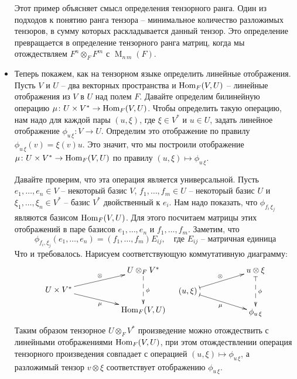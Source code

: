 \begin{itemize}
Этот пример объясняет смысл определения тензорного ранга. Один из подходов к понятию ранга тензора -- минимальное количество разложимых тензоров, в сумму которых раскладывается данный тензор. Это определение превращается в определение тензорного ранга матриц, когда мы отождествляем $F^n\otimes_F F^m$ с $\operatorname{M}_{n\,m}(F)$.

\item Теперь покажем, как на тензорном языке определить линейные отображения. Пусть $V$ и $U$ -- два векторных пространства и $\operatorname{Hom}_F(V, U)$ -- линейные отображения из $V$ в $U$ над полем $F$. Давайте определим билинейную операцию $\mu \colon U\times V^* \to \operatorname{Hom}_F(V, U)$. Чтобы определить такую операцию, нам надо для каждой пары $(u,\xi)$, где $\xi \in V^*$ и $u\in U$, задать линейное отображение $\phi_{u\,\xi}\colon V\to U$. Определим это отображение по правилу $\phi_{u\,\xi}(v) = \xi(v)u$. Это значит, что мы построили отображение $\mu\colon U\times V^* \to \operatorname{Hom}_F(V, U)$ по правилу $(u,\xi)\mapsto \phi_{u\,\xi}$. 

Давайте проверим, что эта операция является универсальной. Пусть $e_1,\ldots,e_n\in V$ -- некоторый базис $V$, $f_1,\ldots,f_m\in U$ -- некоторый базис $U$ и $\xi_1,\ldots,\xi_n\in V^*$ -- базис $V^*$ двойственный к $e_i$. Нам надо показать, что $\phi_{f_i\,\xi_j}$ являются базисом $\operatorname{Hom}_F(V, U)$. Для этого посчитаем матрицы этих отображений в паре базисов $e_1,\ldots,e_n$ и $f_1,\ldots,f_m$. Заметим, что
\[
\phi_{f_i, \xi_j}(e_1,\ldots,e_n) = (f_1,\ldots,f_m)E_{ij},\quad\text{где $E_{ij}$ -- матричная единица}
\]
Что и требовалось. Нарисуем соответствующую коммутативную диаграмму:
\[
\xymatrix@R=10pt{
	{}&{}&{U\otimes_F V^*}\ar@{-->}[dd]^{\phi}\\
	{U\times V^*}\ar[urr]^{\otimes}\ar[drr]_{\mu}&{}&{}\\
	{}&{}&{\Hom_F(V, U)}\\
}
\quad
\xymatrix@R=10pt{
	{}&{}&{u\otimes \xi}\ar@{|-->}[dd]^{\phi}\\
	{(u, \xi)}\ar@{|->}[urr]^{\otimes}\ar@{|->}[drr]_{\mu}&{}&{}\\
	{}&{}&{\phi_{u\,\xi}}\\
}
\]
Таким образом тензорное $U\otimes_F V^*$ произведение можно отождествить с линейными отображениями $\operatorname{Hom}_F(V, U)$, при этом отождествлении операция тензорного произведения совпадает с операцией $(u, \xi)\mapsto \phi_{u\,\xi}$, а разложимый тензор $v\otimes \xi$ соответствует отображению $\phi_{u\,\xi}$.


\end{itemize}

